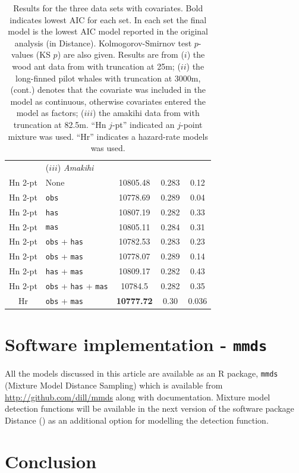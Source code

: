 \begin{table}
\begin{tabular}{c l c c c}
 & ($iii$) \textit{Amakihi} & & & \\
Hn 2-pt & None & 10805.48 & 0.283 & 0.12 \\
Hn 2-pt & \texttt{obs} & 10778.69 & 0.289 & 0.04\\
Hn 2-pt & \texttt{has} & 10807.19 &  0.282 & 0.33\\
Hn 2-pt & \texttt{mas} & 10805.11 &  0.284 & 0.31\\
Hn 2-pt & \texttt{obs} + \texttt{has} & 10782.53 & 0.283 &  0.23\\
Hn 2-pt & \texttt{obs} + \texttt{mas} & 10778.07 & 0.289 &  0.14\\
Hn 2-pt & \texttt{has} + \texttt{mas} & 10809.17 & 0.282 &  0.43 \\
Hn 2-pt & \texttt{obs} + \texttt{has} + \texttt{mas} & 10784.5 & 0.282 &  0.35\\
Hr & \texttt{obs} + \texttt{mas} & \textbf{10777.72} & 0.30 & 0.036 \\
\end{tabular}
\caption{Results for the three data sets with covariates. Bold indicates lowest AIC for each set. In each set the final model is the lowest AIC model reported in the original analysis (in Distance). Kolmogorov-Smirnov test $p$-values (KS $p$) are also given. Results are from ($i$) the wood ant data from  with truncation at 25m; ($ii$) the long-finned pilot whales  with truncation at 3000m, (cont.) denotes that the covariate was included in the model as continuous, otherwise covariates entered the model as factors; ($iii$) the amakihi data from  with truncation at 82.5m. ``Hn $j$-pt'' indicated an $j$-point mixture was used. ``Hr'' indicates a hazard-rate models was used.}
\label{big-results-table}
\end{table}


\section{Software implementation - \texttt{mmds}}

All the models discussed in this article are available as an \textsf{R} package, \texttt{mmds} (Mixture Model Distance Sampling) which is available from \url{http://github.com/dill/mmds} along with documentation. Mixture model detection functions will be available in the next version of the software package Distance (\cite{distance-software}) as an additional option for modelling the detection function.

\section{Conclusion}
\label{s:discuss}

